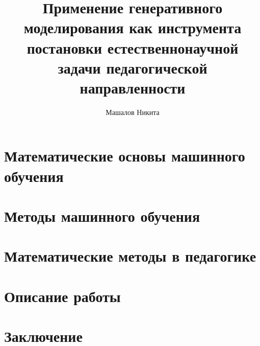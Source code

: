 \documentclass{mipt-thesis-bs}
\title{Применение генеративного моделирования как инструмента постановки естественнонаучной задачи педагогической направленности}
\author{Машалов Никита}
\begin{document}


\chapter{Математические основы машинного обучения}

\chapter{Методы машинного обучения}

\chapter{Математические методы в педагогике}

\chapter{Описание работы}

\chapter{Заключение}



\printbib
\end{document}
